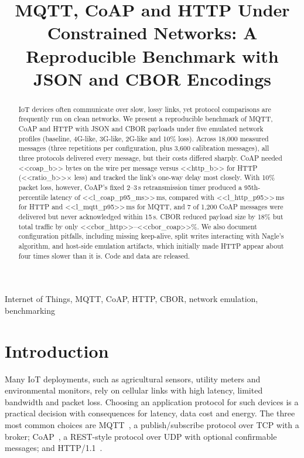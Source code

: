 \documentclass[conference]{IEEEtran}
\begin{document}
\title{MQTT, CoAP and HTTP Under Constrained Networks: A Reproducible Benchmark with JSON and CBOR Encodings}

\author{
}

\maketitle

\begin{abstract}
IoT devices often communicate over slow, lossy links, yet protocol comparisons are frequently run on clean networks. We present a reproducible benchmark of MQTT, CoAP and HTTP with JSON and CBOR payloads under five emulated network profiles (baseline, 4G-like, 3G-like, 2G-like and 10\% loss). Across 18,000 measured messages (three repetitions per configuration, plus 3,600 calibration messages), all three protocols delivered every message, but their costs differed sharply. CoAP needed <<coap_b>> bytes on the wire per message versus <<http_b>> for HTTP (<<ratio_b>>$\times$ less) and tracked the link's one-way delay most closely. With 10\% packet loss, however, CoAP's fixed 2--3\,s retransmission timer produced a 95th-percentile latency of <<l_coap_p95_ms>>\,ms, compared with <<l_http_p95>>\,ms for HTTP and <<l_mqtt_p95>>\,ms for MQTT, and 7 of 1,200 CoAP messages were delivered but never acknowledged within 15\,s. CBOR reduced payload size by 18\% but total traffic by only <<cbor_http>>--<<cbor_coap>>\%. We also document configuration pitfalls, including missing keep-alive, split writes interacting with Nagle's algorithm, and host-side emulation artifacts, which initially made HTTP appear about four times slower than it is. Code and data are released.
\end{abstract}

\begin{IEEEkeywords}
Internet of Things, MQTT, CoAP, HTTP, CBOR, network emulation, benchmarking
\end{IEEEkeywords}

\section{Introduction}
Many IoT deployments, such as agricultural sensors, utility meters and environmental monitors, rely on cellular links with high latency, limited bandwidth and packet loss. Choosing an application protocol for such devices is a practical decision with consequences for latency, data cost and energy. The three most common choices are MQTT~\cite{mqtt311}, a publish/subscribe protocol over TCP with a broker; CoAP~\cite{rfc7252}, a REST-style protocol over UDP with optional confirmable messages; and HTTP/1.1~\cite{rfc9112}.
\end{document}
